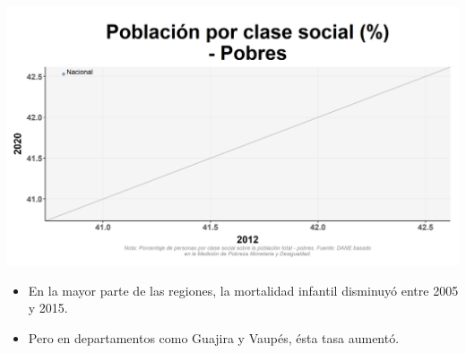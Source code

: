 \documentclass[aspectratio=169]{beamer}
\begin{document}
        \begin{slide}{13} 
                      \begin{imagecolumn}
                \includegraphics[width=\columnwidth]{img/var_242_scatter_time.png}
            \end{imagecolumn}
            \begin{textcolumn}
                \begin{itemize}
                    \item En la mayor parte de las regiones, la mortalidad infantil disminuyó entre 2005 y 2015. 
                    \item Pero en departamentos como Guajira y Vaupés, ésta tasa aumentó.
                \end{itemize}
            \end{textcolumn}

    \printcolumns
    \end{slide}
  
  
\end{document}
